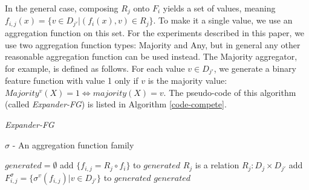 \documentclass{article}
\theoremstyle{definition}
\begin{document}
In the general case, composing $R_j$ onto $F_i$ yields a set of values, meaning $f_{i,j}(x)=\{v\in D_{j'}|(f_i(x),v)\in R_j\}$. 
To make it a single value, we use an aggregation function on this set.
For the experiments described in this paper, we use  
 two aggregation function types: Majority and Any, but in general any other reasonable aggregation function can be used instead.
The Majority aggregator, for example, is defined as follows.  For each value $v\in D_{j'}$, we generate a binary feature function with value 1 only if $v$ is the majority value: 
$Majority^v(X)=1 \iff majority(X)=v$.
The pseudo-code of this algorithm (called   
\emph{Expander-FG}) is listed in Algorithm \ref{code-compete}.


\begin{algorithm}[H]
	\caption{\emph{Expander-FG}}
	\label{code-compete}
	\small
	$\sigma$ - An aggregation function family
	\begin{algorithmic}
		\State $generated=\emptyset$
		\State add $\{f_{i,j}=R_j\circ f_i\}$ to $generated$
		\Else \Comment $R_j$ is a relation $R_j:D_j\times D_{j'}$
		\State add $F^\sigma_{i,j}=\{\sigma^v(f_{i,j})|v\in D_{j'}\}$ to $generated$
		\EndIf
		\EndFor
		\EndFor
		\State \Return $generated$ 
		\EndFunction
		
	\end{algorithmic}
\end{algorithm}
\end{document}
